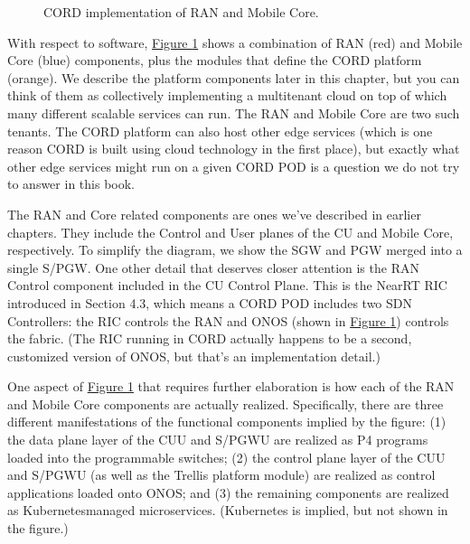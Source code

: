 \documentclass[a4paper,11pt,english]{sphinxmanual}
\let\sphinxpxdimen\pdfpxdimen\else\newdimen\sphinxpxdimen
\begin{document}
\begin{figure}[ht]
\centering
\capstart

\noindent\sphinxincludegraphics[width=650\sphinxpxdimen]{{Slide25}.png}
\caption{CORD implementation of RAN and Mobile Core.}\label{\detokenize{impl:id1}}\label{\detokenize{impl:fig-cord}}\end{figure}

\sphinxAtStartPar
With respect to software, \hyperref[\detokenize{impl:fig-cord}]{Figure \ref{\detokenize{impl:fig-cord}}} shows a
combination of RAN (red) and Mobile Core (blue) components, plus the
modules that define the CORD platform (orange). We describe the
platform components later in this chapter, but you can think of them
as collectively implementing a multi\sphinxhyphen{}tenant cloud on top of which many
different scalable services can run. The RAN and Mobile Core are two
such tenants.  The CORD platform can also host other edge services
(which is one reason CORD is built using cloud technology in the first
place), but exactly what other edge services might run on a given CORD
POD is a question we do not try to answer in this book.

\sphinxAtStartPar
The RAN and Core related components are ones we’ve described in
earlier chapters. They include the Control and User planes of the CU
and Mobile Core, respectively. To simplify the diagram, we show
the SGW and PGW merged into a single S/PGW. One other detail that
deserves closer attention is the RAN Control component included in the
CU Control Plane.  This is the Near\sphinxhyphen{}RT RIC introduced in Section 4.3,
which means a CORD POD includes two SDN Controllers: the RIC controls
the RAN and ONOS (shown in \hyperref[\detokenize{impl:fig-cord}]{Figure \ref{\detokenize{impl:fig-cord}}}) controls the
fabric.  (The RIC running in CORD actually happens to be a second,
customized version of ONOS, but that’s an implementation detail.)

\sphinxAtStartPar
One aspect of \hyperref[\detokenize{impl:fig-cord}]{Figure \ref{\detokenize{impl:fig-cord}}} that requires further
elaboration is how each of the RAN and Mobile Core components are
actually realized. Specifically, there are three different
manifestations of the functional components implied by the figure: (1)
the data plane layer of the CU\sphinxhyphen{}U and S/PGW\sphinxhyphen{}U are realized as P4
programs loaded into the programmable switches; (2) the control plane
layer of the CU\sphinxhyphen{}U and S/PGW\sphinxhyphen{}U (as well as the Trellis platform module)
are realized as control applications loaded onto ONOS;
and (3) the remaining components are realized as Kubernetes\sphinxhyphen{}managed
microservices. (Kubernetes is implied, but not shown in the figure.)
\end{document}
